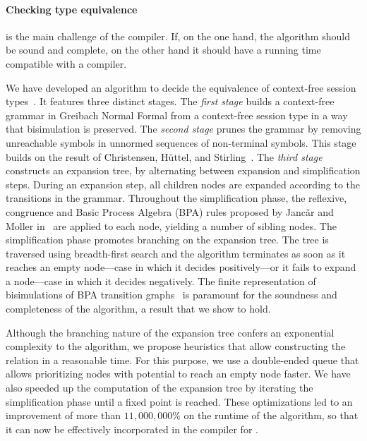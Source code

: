 
\paragraph{Checking type equivalence}

is the main challenge of the compiler. If, on the one hand, the
algorithm should be sound and complete, on the other hand it should
have a running time compatible with a compiler.  %

We have developed an algorithm to decide the equivalence of
context-free session types~\cite{typeEquivalence}.  It features three
distinct stages.
%
The \emph{first stage} builds a context-free grammar in Greibach
Normal Formal %
from a context-free session type in a way that bisimulation is
preserved.
%
The \emph{second stage} prunes the grammar by removing unreachable
symbols in unnormed sequences of non-terminal symbols. This stage
builds on the result of Christensen, H\"uttel, and 
Stirling~\cite{DBLP:journals/iandc/ChristensenHS95}.
%
The \emph{third stage} constructs an expansion tree, by alternating
between expansion and simplification steps. During an expansion step, 
all children nodes are expanded according to the transitions in the 
grammar. %
Throughout the simplification phase, the reflexive, congruence and
Basic Process Algebra (BPA) rules proposed by Janc\v ar and Moller
in~\cite{janvcar1999techniques} are applied to each node, yielding a
number of sibling nodes.  The simplification phase promotes branching
on the expansion tree.  The tree is traversed using breadth-first
search and the algorithm terminates as soon as it reaches an empty
node---case in which it decides positively---or it fails to expand a
node---case in which it decides negatively.  The finite representation
of bisimulations of BPA transition
graphs~\cite{caucal1986decidabilite,
  DBLP:journals/iandc/ChristensenHS95} is paramount for the soundness
and completeness of the algorithm, a result that we show to hold.

Although the branching nature of the expansion tree confers an
exponential complexity to the algorithm, we propose heuristics that
allow constructing the relation in a reasonable time. For this
purpose, we use a double-ended queue that allows prioritizing nodes
with potential to reach an empty node faster.  We have also speeded up
the computation of the expansion tree by iterating the simplification
phase until a fixed point is reached.  These optimizations led to an
improvement of more than $11,000,000\%$ on the runtime of the
algorithm, so that it can now be effectively incorporated in the
compiler for \freest.

